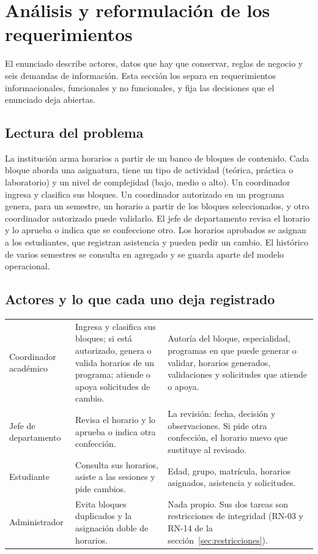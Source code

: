 \section{Análisis y reformulación de los requerimientos}\label{sec:requerimientos}

El enunciado describe actores, datos que hay que conservar, reglas de negocio y seis demandas de información. Esta sección los separa en requerimientos informacionales, funcionales y no funcionales, y fija las decisiones que el enunciado deja abiertas.

\subsection{Lectura del problema}

La institución arma horarios a partir de un banco de bloques de contenido. Cada bloque aborda una asignatura, tiene un tipo de actividad (teórica, práctica o laboratorio) y un nivel de complejidad (bajo, medio o alto). Un coordinador ingresa y clasifica sus bloques. Un coordinador autorizado en un programa genera, para un semestre, un horario a partir de los bloques seleccionados, y otro coordinador autorizado puede validarlo. El jefe de departamento revisa el horario y lo aprueba o indica que se confeccione otro. Los horarios aprobados se asignan a los estudiantes, que registran asistencia y pueden pedir un cambio. El histórico de varios semestres se consulta en agregado y se guarda aparte del modelo operacional.

\subsection{Actores y lo que cada uno deja registrado}

{\small\filas
\begin{xltabular}{\linewidth}{L{0.6}L{1.2}L{1.2}}
 &  &  \\
\endhead
Coordinador académico & Ingresa y clasifica sus bloques; si está autorizado, genera o valida horarios de un programa; atiende o apoya solicitudes de cambio. & Autoría del bloque, especialidad, programas en que puede generar o validar, horarios generados, validaciones y solicitudes que atiende o apoya. \\
Jefe de departamento & Revisa el horario y lo aprueba o indica otra confección. & La revisión: fecha, decisión y observaciones. Si pide otra confección, el horario nuevo que sustituye al revisado. \\
Estudiante & Consulta sus horarios, asiste a las sesiones y pide cambios. & Edad, grupo, matrícula, horarios asignados, asistencia y solicitudes. \\
Administrador & Evita bloques duplicados y la asignación doble de horarios. & Nada propio. Sus dos tareas son restricciones de integridad (RN-03 y RN-14 de la sección~\ref{sec:restricciones}). \\
\end{xltabular}}

